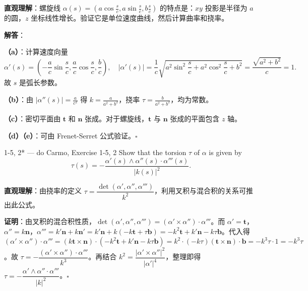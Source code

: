\begin{solution}
\textbf{直观理解}：螺旋线 $\alpha(s) = (a\cos\frac{s}{c}, a\sin\frac{s}{c}, b\frac{s}{c})$ 的特点是：$xy$ 投影是半径为 $a$ 的圆，$z$ 坐标线性增长。验证它是单位速度曲线，然后计算曲率和挠率。

\textbf{解答}：

\textbf{（a）}：计算速度向量
\[
\alpha'(s) = \left(-\frac{a}{c}\sin\frac{s}{c}, \frac{a}{c}\cos\frac{s}{c}, \frac{b}{c}\right),
\quad |\alpha'(s)| = \frac{1}{c}\sqrt{a^2\sin^2\frac{s}{c}+a^2\cos^2\frac{s}{c}+b^2} = \frac{\sqrt{a^2+b^2}}{c} = 1.
\]
故 $s$ 是弧长参数。

\textbf{（b）}：由 $|\alpha''(s)| = \frac{a}{c^2}$ 得 $k = \frac{a}{a^2+b^2}$，挠率 $\tau = \frac{b}{a^2+b^2}$，均为常数。

\textbf{（c）}：密切平面由 $\mathbf{t}$ 和 $\mathbf{n}$ 张成。对于螺旋线，$\mathbf{t}$ 与 $\mathbf{n}$ 张成的平面包含 $z$ 轴。

\textbf{（d）（e）}：可由 Frenet-Serret 公式验证。$\square$
\end{solution}

\begin{exercise}{1-5, 2* — do Carmo, Exercise 1-5, 2}
Show that the torsion $\tau$ of $\alpha$ is given by
\[
\tau(s) = - \frac{\alpha'(s) \wedge \alpha''(s) \cdot \alpha'''(s)}{|k(s)|^2}.
\]
\end{exercise}

\begin{solution}
\textbf{直观理解}：由挠率的定义 $\tau = \dfrac{\det(\alpha', \alpha'', \alpha''')}{k^2}$，利用叉积与混合积的关系可推出此公式。

\textbf{证明}：由叉积的混合积性质，$\det(\alpha', \alpha'', \alpha''') = (\alpha'\times\alpha'')\cdot\alpha'''$。而 $\alpha' = \mathbf{t}$，$\alpha'' = k\mathbf{n}$，$\alpha''' = k'\mathbf{n} + k\mathbf{n}' = k'\mathbf{n} + k(-k\mathbf{t}+\tau\mathbf{b}) = -k^2\mathbf{t} + k'\mathbf{n} - k\tau\mathbf{b}$。代入得 $(\alpha'\times\alpha'')\cdot\alpha''' = (k\mathbf{t}\times\mathbf{n})\cdot(-k^2\mathbf{t}+k'\mathbf{n}-k\tau\mathbf{b}) = k^2\cdot(-k\tau)(\mathbf{t}\times\mathbf{n})\cdot\mathbf{b} = -k^3\tau\cdot 1 = -k^3\tau$。故 $\tau = -\dfrac{(\alpha'\times\alpha'')\cdot\alpha'''}{k^3}$。再结合 $k^2 = \dfrac{|\alpha'\times\alpha''|^2}{|\alpha'|^4}$，整理即得 $\tau = -\dfrac{\alpha'\wedge\alpha''\cdot\alpha'''}{|k|^2}$。$\square$
\end{solution}

